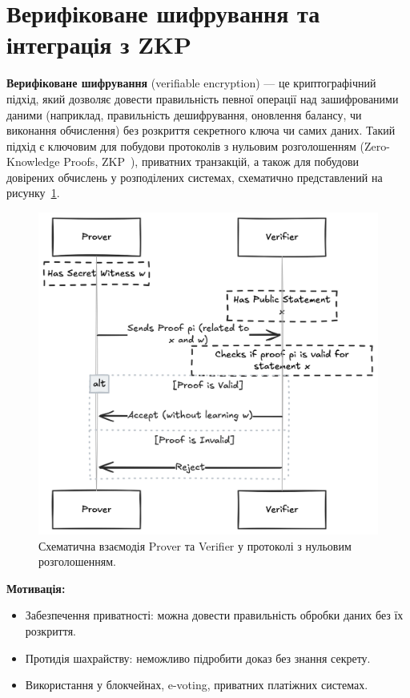 \section{Верифіковане шифрування та інтеграція з ZKP}
\label{sec:verifiable_encryption}

\textbf{Верифіковане шифрування} (verifiable encryption) --- це криптографічний підхід, який дозволяє довести правильність певної операції над зашифрованими даними (наприклад, правильність дешифрування, оновлення балансу, чи виконання обчислення) без розкриття секретного ключа чи самих даних.
Такий підхід є ключовим для побудови протоколів з нульовим розголошенням (Zero-Knowledge Proofs, ZKP~\cite{GoldwasserEtAl89, ParnoEtAl13Pinocchio}), приватних транзакцій, а також для побудови довірених обчислень у розподілених системах, схематично представлений на рисунку~\ref{fig:zkp_interaction}.

\begin{figure}[ht]
    \centering
    \includegraphics[width=0.4\textheight,keepaspectratio]{pictures/prover-verifier-image}
    \caption{Схематична взаємодія Prover та Verifier у протоколі з нульовим розголошенням.}
    \label{fig:zkp_interaction}
\end{figure}

\textbf{Мотивація:}
\begin{itemize}
    \item Забезпечення приватності: можна довести правильність обробки даних без їх розкриття.
    \item Протидія шахрайству: неможливо підробити доказ без знання секрету.
    \item Використання у блокчейнах, e-voting, приватних платіжних системах.
\end{itemize}

